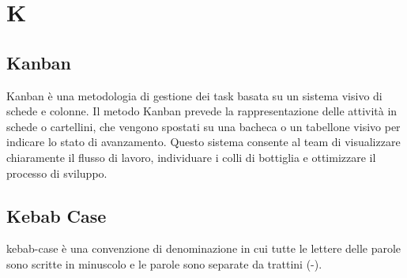 \section{K}

\vspace{2em}
\subsection*{Kanban}
\par Kanban è una metodologia di gestione dei task basata su un sistema visivo di schede e colonne. Il metodo Kanban prevede la rappresentazione delle attività in schede o cartellini, che vengono spostati su una bacheca o un tabellone visivo per indicare lo stato di avanzamento. Questo sistema consente al team di visualizzare chiaramente il flusso di lavoro, individuare i colli di bottiglia e ottimizzare il processo di sviluppo.

\vspace{2em}
\subsection*{Kebab Case}
\par kebab-case è una convenzione di denominazione in cui tutte le lettere delle parole sono scritte in minuscolo e le parole sono separate da trattini (-).
